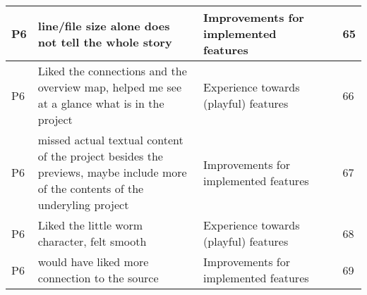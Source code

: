 \begin{appendices}
\begin{landscape}
\begin{longtable}{|p{0.8cm}|p{7cm}|p{3cm}|p{3cm}|p{5.5cm}|p{0.5cm}|}
      P6                   & line/file size alone does not tell the whole story                                                                                                                                                                                                                          & Improvements for implemented features    &                                    &                                                                                                                                                    & 65           \\ \hline
      P6                   & Liked the connections and the overview map, helped me see at a glance what is in the project                                                                                                                                                                                & Experience towards (playful) features    &                                    &                                                                                                                                                    & 66           \\ \hline
      P6                   & missed actual textual content of the project besides the previews, maybe include more of the contents of the underyling project                                                                                                                                             & Improvements for implemented features    &                                    &                                                                                                                                                    & 67           \\ \hline
      P6                   & Liked the little worm character, felt smooth                                                                                                                                                                                                                                & Experience towards (playful) features    &                                    &                                                                                                                                                    & 68           \\ \hline
      P6                   & would have liked more connection to the source                                                                                                                                                                                                                              & Improvements for implemented features    &                                    &                                                                                                                                                    & 69           \\ \hline

\end{longtable}
\end{landscape}
\end{appendices}
